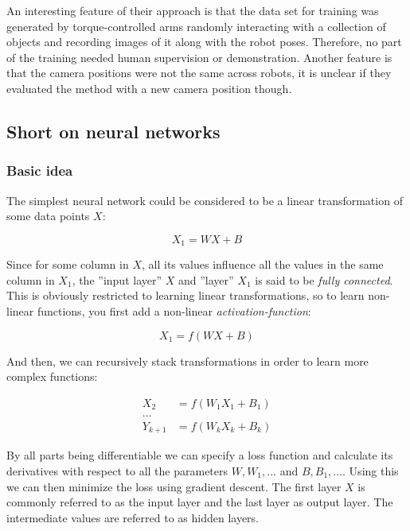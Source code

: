 An interesting feature of their approach is that the data set for training was
generated by torque-controlled arms randomly interacting with a collection of
objects and recording images of it along with the robot poses. Therefore, no
part of the training needed human supervision or demonstration. Another feature
is that the camera positions were not the same across robots, it is unclear if
they evaluated the method with a new camera position though.

\subsection{Short on neural networks}

\subsubsection{Basic idea}

The simplest neural network could be considered to be a linear transformation
of some data points $X$:

\begin{equation}
    X_1 = WX + B
\end{equation}

Since for some column in $X$, all its values influence all the values in the
same column in $X_1$, the ''input layer'' $X$ and ''layer'' $X_1$ is said to be
\textit{fully connected}. This is obviously restricted to learning linear
transformations, so to learn non-linear functions, you first add a non-linear
\textit{activation-function}:

\begin{equation}
    X_1 = f(WX + B)
\end{equation}

And then, we can recursively stack transformations in order to learn more complex
functions:

\begin{align}
    X_2 &= f(W_1X_1 + B_1)\\
    ...\\
    Y_{k+1} &= f(W_kX_k + B_k)
\end{align}

By all parts being differentiable we can specify a loss function and calculate
its derivatives with respect to all the parameters $W, W_1,...$ and $B, B_1,
...$. Using this we can then minimize the loss using gradient descent. The first
layer $X$ is commonly referred to as the input layer and the last layer as output
layer. The intermediate values are referred to as hidden layers.

